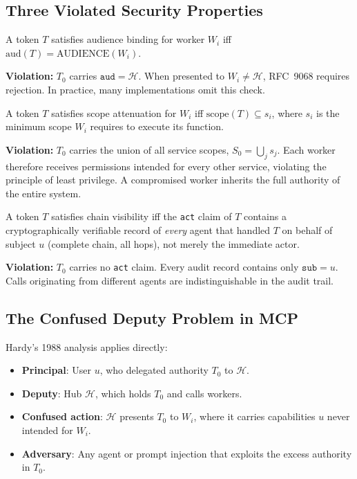 \documentclass[journal]{IEEEtran}
\begin{document}
\subsection{Three Violated Security Properties}

\begin{definition}
A token $T$ satisfies audience binding for worker $W_i$ iff
$\mathrm{aud}(T) = \mathrm{AUDIENCE}(W_i)$.
\end{definition}

\textbf{Violation:} $T_0$ carries $\texttt{aud} = \mathcal{H}$. When presented
to $W_i \neq \mathcal{H}$, RFC~9068 requires rejection. In practice, many
implementations omit this check.

\begin{definition}
A token $T$ satisfies scope attenuation for $W_i$ iff
$\mathrm{scope}(T) \subseteq s_i$, where $s_i$ is the minimum scope $W_i$
requires to execute its function.
\end{definition}

\textbf{Violation:} $T_0$ carries the union of all service scopes,
$S_0 = \bigcup_j s_j$. Each worker therefore receives permissions intended
for every other service, violating the principle of least privilege. A
compromised worker inherits the full authority of the entire system.

\begin{definition}
A token $T$ satisfies chain visibility iff the \texttt{act} claim of $T$
contains a cryptographically verifiable record of \emph{every} agent that
handled $T$ on behalf of subject $u$ (complete chain, all hops), not merely
the immediate actor.
\end{definition}

\textbf{Violation:} $T_0$ carries no \texttt{act} claim. Every audit record
contains only $\texttt{sub} = u$. Calls originating from different agents are
indistinguishable in the audit trail.

\subsection{The Confused Deputy Problem in MCP}

Hardy's 1988 analysis \cite{hardy1988} applies directly:

\begin{itemize}
  \item \textbf{Principal}: User $u$, who delegated authority $T_0$ to
        $\mathcal{H}$.
  \item \textbf{Deputy}: Hub $\mathcal{H}$, which holds $T_0$ and calls workers.
  \item \textbf{Confused action}: $\mathcal{H}$ presents $T_0$ to $W_i$, where
        it carries capabilities $u$ never intended for $W_i$.
  \item \textbf{Adversary}: Any agent or prompt injection that exploits the
        excess authority in $T_0$.
\end{itemize}
\end{document}
